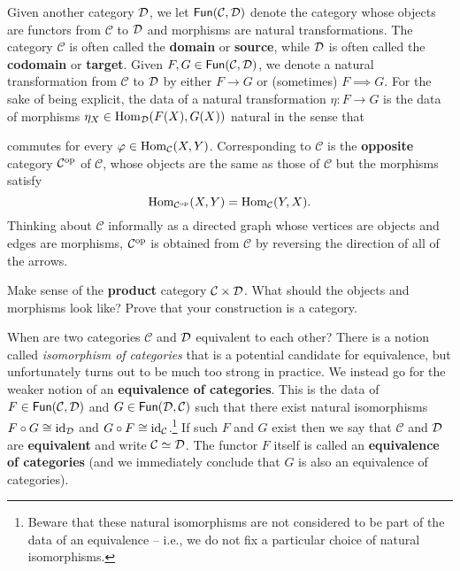 \documentclass[11pt]{article}
\renewcommand{\C}{\mathcal{C}}
\renewcommand{\phi}{\varphi}
\begin{document}
Given another category $\mathcal{D}$, we let $\Fun(\C,\D)$ denote the category whose objects are functors from $\C$ to $\mathcal{D}$ and morphisms are natural transformations. The category $\C$ is often called the \textbf{domain} or \textbf{source}, while $\mathcal{D}$ is often called the \textbf{codomain} or \textbf{target}. Given $F,G\in\Fun(\C,\D)$, we denote a natural transformation from $\C$ to $\mathcal{D}$ by either $F\to G$ or (sometimes) $F\implies G$. For the sake of being explicit, the data of a natural transformation $\eta: F\to G$ is the data of morphisms $\eta_X\in\operatorname{Hom}_{\mathcal{D}}(F(X),G(X))$ natural in the sense that 
\begin{center}
\end{center}
commutes for every $\phi\in\Hom_{\C}(X,Y)$. Corresponding to $\C$ is the \textbf{opposite} category $\C^{\op}$ of $\C$, whose objects are the same as those of $\C$ but the morphisms satisfy
$$\Hom_{\C^{\op}}(X,Y)=\Hom_{\C}(Y,X).$$
Thinking about $\C$ informally as a directed graph whose vertices are objects and edges are morphisms, $\C^{\op}$ is obtained from $\C$ by reversing the direction of all of the arrows.

\begin{exercise}
Make sense of the \textbf{product} category $\C\times\D$. What should the objects and morphisms look like? Prove that your construction is a category.
\end{exercise}

When are two categories $\C$ and $\mathcal{D}$ equivalent to each other? There is a notion called \emph{isomorphism of categories} that is a potential candidate for equivalence, but unfortunately turns out to be much too strong in practice. We instead go for the weaker notion of an \textbf{equivalence of categories}. This is the data of $F\in\Fun(\C,\D)$ and $G\in\Fun(\D,\C)$ such that there exist natural isomorphisms $F\circ G\cong\operatorname{id}_{\mathcal{D}}$ and $G\circ F\iso\id_{\C}$.\footnote{Beware that these natural isomorphisms are not considered to be part of the data of an equivalence -- i.e., we do not fix a particular choice of natural isomorphisms.} If such $F$ and $G$ exist then we say that $\C$ and $\mathcal{D}$ are \textbf{equivalent} and write $\C\simeq\D$. The functor $F$ itself is called an \textbf{equivalence of categories} (and we immediately conclude that $G$ is also an equivalence of categories).
\end{document}

